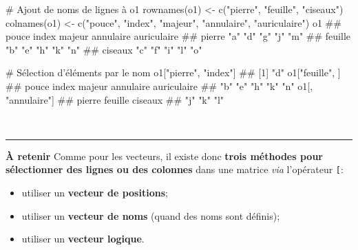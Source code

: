 \documentclass[12pt,twosided, notitlepage]{book}
\newenvironment{Shaded}{}{}
\newcommand{\KeywordTok}[1]{\textcolor[rgb]{0.00,0.00,1.00}{#1}}
\newcommand{\StringTok}[1]{\textcolor[rgb]{0.00,0.50,0.50}{#1}}
\newcommand{\CommentTok}[1]{\textcolor[rgb]{0.00,0.50,0.00}{#1}}
\newcommand{\NormalTok}[1]{#1}
\providecommand{\tightlist}{%
  \setlength{\itemsep}{0pt}\setlength{\parskip}{0pt}}
\renewenvironment{Shaded}{\begin{snugshade}}{\end{snugshade}}
\begin{document}
\begin{Shaded}
\begin{Highlighting}[]
\CommentTok{# Ajout de noms de lignes à o1}
\KeywordTok{rownames}\NormalTok{(o1) <-}\StringTok{ }\KeywordTok{c}\NormalTok{(}\StringTok{"pierre"}\NormalTok{, }\StringTok{"feuille"}\NormalTok{, }\StringTok{"ciseaux"}\NormalTok{)}
\KeywordTok{colnames}\NormalTok{(o1) <-}\StringTok{ }\KeywordTok{c}\NormalTok{(}\StringTok{"pouce"}\NormalTok{, }\StringTok{"index"}\NormalTok{, }\StringTok{"majeur"}\NormalTok{, }\StringTok{"annulaire"}\NormalTok{, }\StringTok{"auriculaire"}\NormalTok{)}
\NormalTok{o1}
\NormalTok{  ##         pouce index majeur annulaire auriculaire}
\NormalTok{  ## pierre  "a"   "d"   "g"    "j"       "m"        }
\NormalTok{  ## feuille "b"   "e"   "h"    "k"       "n"        }
\NormalTok{  ## ciseaux "c"   "f"   "i"    "l"       "o"}

\CommentTok{# Sélection d'éléments par le nom}
\NormalTok{o1[}\StringTok{"pierre"}\NormalTok{, }\StringTok{"index"}\NormalTok{]}
\NormalTok{  ## [1] "d"}
\NormalTok{o1[}\StringTok{"feuille"}\NormalTok{, ]}
\NormalTok{  ##       pouce       index      majeur   annulaire auriculaire }
\NormalTok{  ##         "b"         "e"         "h"         "k"         "n"}
\NormalTok{o1[, }\StringTok{"annulaire"}\NormalTok{]}
\NormalTok{  ##  pierre feuille ciseaux }
\NormalTok{  ##     "j"     "k"     "l"}
\end{Highlighting}
\end{Shaded}

~

\begin{center}\rule{0.5\linewidth}{\linethickness}\end{center}

\textbf{À retenir} Comme pour les vecteurs, il existe donc \textbf{trois
méthodes pour sélectionner des lignes ou des colonnes} dans une matrice
\emph{via} l'opérateur \texttt{{[}}\index{\texttt{[}}:

\begin{itemize}
\tightlist
\item
  utiliser un \textbf{vecteur de positions};
\item
  utiliser un \textbf{vecteur de noms} (quand des noms sont définis);
\item
  utiliser un \textbf{vecteur logique}.
\end{itemize}
\end{document}
